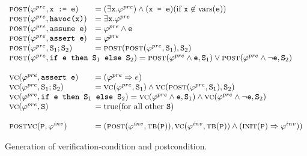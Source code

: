 
\begin{figure}
\[
\begin{array}{ll}
\postfn(\pre, \code{x := e}) &= (\exists \code{x}. \pre) \wedge (\code{x = e}) (\text{if } \code{x} \not\in \text{vars}(\code{e})) \\
\postfn(\pre, \code{havoc(x)}) &= \exists \code{x}. \pre \\
\postfn(\pre, \code{assume e}) &= \pre \wedge \code{e} \\
\postfn(\pre, \code{assert e}) &= \pre \\
\postfn(\pre, \stmtSA ; \stmtSB) &= \postfn( \postfn(\pre, \stmtSA), \stmtSB) \\
\multicolumn{2}{l}{\postfn(\pre, \code{if \expr{} then \stmtSA{} else \stmtSB{}}) = \postfn(\pre \wedge \expr, \stmtSA) \vee \postfn(\pre \wedge \neg \expr, \stmtSB)} \\
\\
\vcfn(\pre, \code{assert e}) &= (\pre \Rightarrow e) \\
\vcfn(\pre, \stmtSA ; \stmtSB) &= \vcfn(\pre, \stmtSA) \wedge \vcfn( \postfn(\pre, \stmtSA), \stmtSB) \\
\multicolumn{2}{l}{
\vcfn(\pre, \code{if \expr{} then \stmtSA{} else \stmtSB{}}) = \vcfn(\pre \wedge \expr, \stmtSA) \wedge \vcfn(\pre \wedge \neg \expr, \stmtSB)
} \\
\vcfn(\pre, \stmt) &= \text{true} (\text{for all other \stmt}) \\
\\
\mainvc{\procP}{\inv} &= (\postfn(\inv, \tbody(\proc)), \vcfn(\inv, \tbody(\proc)) \wedge (\initstatefn(\proc) \Rightarrow \inv))
\end{array}
\]
\caption{Generation of verification-condition and postcondition.}
\label{fig:vcgen}
\end{figure}

